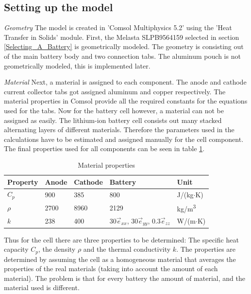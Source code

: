 \subsection{Setting up the model}
\textit{Geometry}\newline
The model is created in 'Comsol Multiphysics 5.2' using the 'Heat Transfer in Solids' module. First, the Melasta SLPB9564159 selected in section \ref{Selecting_A_Battery} is geometrically modeled. The geometry is consisting out of the main battery body and two connection tabs. The aluminum pouch is not geometrically modeled, this is implemented later.

\textit{Material}\newline
Next, a material is assigned to each component. The anode and cathode current collector tabs got assigned aluminum and copper respectively. The material properties in Comsol provide all the required constants for the equations used for the tabs. 
Now for the battery cell however, a material can not be assigned as easily. The lithium-ion battery cell consists out many stacked alternating layers of different materials. Therefore the parameters used in the calculations have to be estimated and assigned manually for the cell component. The final properties used for all components can be seen in table \ref{Table:Material_Properties}.

\begin{table}[H]
\centering
\caption{Material properties}
\label{Table:Material_Properties}
\begin{tabular}{|l|l|l|l|l|}
\hline
Property & Anode & Cathode & Battery & Unit                   \\ \hline \hline
$C_p$       & 900   & 385     & 800     & J/(kg$\cdot$K)               \\
$\rho$      & 2700  & 8960    & 2129    & kg/m\textsuperscript{3} \\
$k$        & 238   & 400     & 30$\vec{e}_{xx}$, 30$\vec{e}_{yy}$, 0.3$\vec{e}_{zz}$      & W/(m$\cdot$K)            	  \\ \hline   
\end{tabular}
\end{table}

Thus for the cell there are three properties to be determined: The specific heat capacity $C_p$, the density $\rho$ and the thermal conductivity $k$. The properties are determined by assuming the cell as a homogeneous material that averages the properties of the real materials (taking into account the amount of each material). The problem is that for every battery the amount of material, and the material used is different. 

